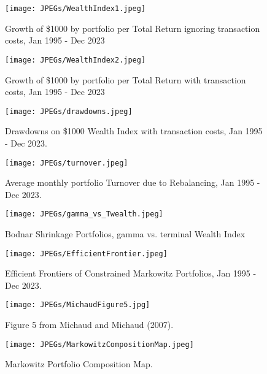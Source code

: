 \documentclass[12pt,letterpaper]{article}
\begin{document}
\begin{figure}
\centering
\texttt{[image: JPEGs/WealthIndex1.jpeg]}
\caption{\label{fig:TotRetWeatlhIndexWithoutTranactionCosts}Growth of \$1000 by portfolio  per Total Return ignoring transaction costs, Jan 1995 - Dec 2023}
\end{figure}

\begin{figure}
\centering
\texttt{[image: JPEGs/WealthIndex2.jpeg]}
\caption{\label{fig:TotRetWeatlhIndexWithTransactionCosts}Growth of \$1000 by portfolio per Total Return with transaction costs, Jan 1995 - Dec 2023}
\end{figure}
\clearpage


\begin{figure}
\centering
\texttt{[image: JPEGs/drawdowns.jpeg]}
\caption{\label{fig:drawdowns}Drawdowns on \$1000 Wealth Index with transaction costs, Jan 1995 - Dec 2023.}
\end{figure}

\begin{figure}
\centering
\texttt{[image: JPEGs/turnover.jpeg]}
\caption{\label{fig:turnover}Average monthly portfolio Turnover due to Rebalancing, Jan 1995 - Dec 2023.}
\end{figure}
\clearpage

\begin{figure}
\centering
\texttt{[image: JPEGs/gamma\_vs\_Twealth.jpeg]}
\caption{\label{fig:gamma_vs_Twealth}Bodnar Shrinkage Portfolios, gamma vs. terminal Wealth Index}
\end{figure}
\clearpage

\begin{figure}
\centering
\texttt{[image: JPEGs/EfficientFrontier.jpeg]}
\caption{\label{fig:MarkowitzFrontiers}Efficient Frontiers of Constrained Markowitz Portfolios, Jan 1995 - Dec 2023.}
\end{figure}

\begin{figure}
\centering
\texttt{[image: JPEGs/MichaudFigure5.jpg]}
\caption{\label{fig:MichaudFigure5} Figure 5 from Michaud and Michaud (2007).}
\end{figure}
\clearpage

\begin{figure}
\centering
\texttt{[image: JPEGs/MarkowitzCompositionMap.jpeg]}
\caption{\label{fig:MarkowitzCompositionMap} Markowitz Portfolio Composition Map.}
\end{figure}
\clearpage
\end{document}
